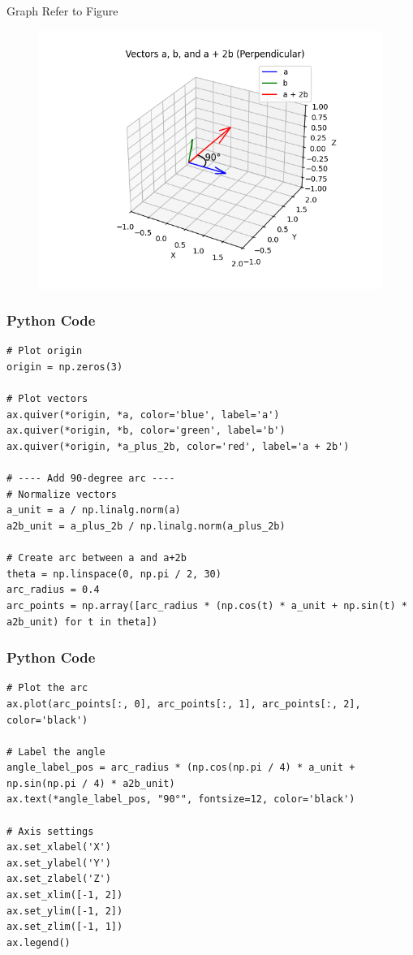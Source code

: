 \documentclass{beamer}
\begin{document}
\begin{frame}{Graph}
   Refer to Figure

\begin{figure}[H]
\begin{center}
\includegraphics[width=0.6\columnwidth]{../figs/graph4.png}
\end{center}
\caption{}
\label{fig:Fig}
\end{figure}  
\end{frame}



\begin{frame}[fragile]
    \frametitle{Python Code}
    \begin{lstlisting}
# Plot origin
origin = np.zeros(3)

# Plot vectors
ax.quiver(*origin, *a, color='blue', label='a')
ax.quiver(*origin, *b, color='green', label='b')
ax.quiver(*origin, *a_plus_2b, color='red', label='a + 2b')

# ---- Add 90-degree arc ----
# Normalize vectors
a_unit = a / np.linalg.norm(a)
a2b_unit = a_plus_2b / np.linalg.norm(a_plus_2b)

# Create arc between a and a+2b
theta = np.linspace(0, np.pi / 2, 30)
arc_radius = 0.4
arc_points = np.array([arc_radius * (np.cos(t) * a_unit + np.sin(t) * a2b_unit) for t in theta])

\end{lstlisting}
\end{frame}

\begin{frame}[fragile]
    \frametitle{Python Code}

    \begin{lstlisting}
# Plot the arc
ax.plot(arc_points[:, 0], arc_points[:, 1], arc_points[:, 2], color='black')

# Label the angle
angle_label_pos = arc_radius * (np.cos(np.pi / 4) * a_unit + np.sin(np.pi / 4) * a2b_unit)
ax.text(*angle_label_pos, "90°", fontsize=12, color='black')

# Axis settings
ax.set_xlabel('X')
ax.set_ylabel('Y')
ax.set_zlabel('Z')
ax.set_xlim([-1, 2])
ax.set_ylim([-1, 2])
ax.set_zlim([-1, 1])
ax.legend()


    \end{lstlisting}
\end{frame}
\end{document}
